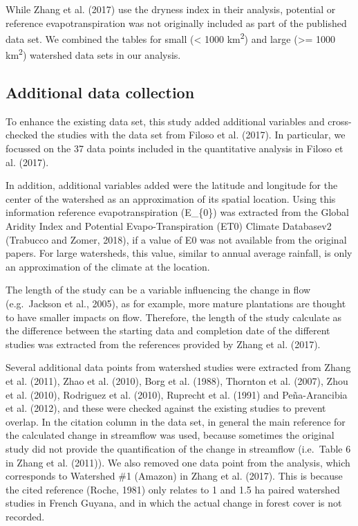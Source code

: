 \documentclass[]{elsarticle} %
\begin{document}
While Zhang et al. (2017) use the dryness index in their analysis,
potential or reference evapotranspiration was not originally included as
part of the published data set. We combined the tables for small
(\textless{} 1000 km\textsuperscript{2}) and large (\textgreater= 1000
km\textsuperscript{2}) watershed data sets in our analysis.

\hypertarget{additional-data-collection}{%
\subsection{Additional data
collection}\label{additional-data-collection}}

To enhance the existing data set, this study added additional variables
and cross-checked the studies with the data set from Filoso et al.
(2017). In particular, we focussed on the 37 data points included in the
quantitative analysis in Filoso et al. (2017).

In addition, additional variables added were the latitude and longitude
for the center of the watershed as an approximation of its spatial
location. Using this information reference evapotranspiration (E\_\{0\})
was extracted from the Global Aridity Index and Potential
Evapo-Transpiration (ET0) Climate Databasev2 (Trabucco and Zomer, 2018),
if a value of E0 was not available from the original papers. For large
watersheds, this value, similar to annual average rainfall, is only an
approximation of the climate at the location.

The length of the study can be a variable influencing the change in flow
(e.g.~Jackson et al., 2005), as for example, more mature plantations are
thought to have smaller impacts on flow. Therefore, the length of the
study calculate as the difference between the starting data and
completion date of the different studies was extracted from the
references provided by Zhang et al. (2017).

Several additional data points from watershed studies were extracted
from Zhang et al. (2011), Zhao et al. (2010), Borg et al. (1988),
Thornton et al. (2007), Zhou et al. (2010), Rodriguez et al. (2010),
Ruprecht et al. (1991) and Peña-Arancibia et al. (2012), and these were
checked against the existing studies to prevent overlap. In the citation
column in the data set, in general the main reference for the calculated
change in streamflow was used, because sometimes the original study did
not provide the quantification of the change in streamflow (i.e.~Table 6
in Zhang et al. (2011)). We also removed one data point from the
analysis, which corresponds to Watershed \#1 (Amazon) in Zhang et al.
(2017). This is because the cited reference (Roche, 1981) only relates
to 1 and 1.5 ha paired watershed studies in French Guyana, and in which
the actual change in forest cover is not recorded.
\end{document}
